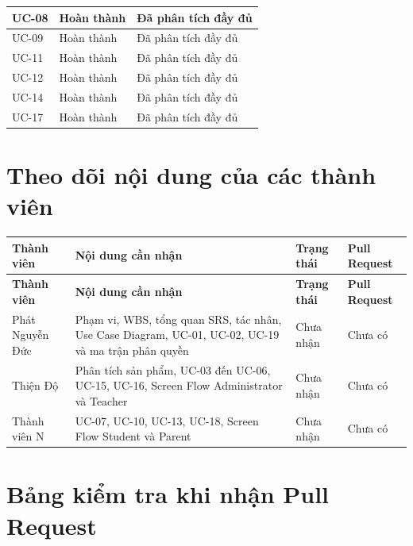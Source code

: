 \documentclass[12pt,a4paper]{article}
\begin{document}
\begin{longtable}{
			|p{8.8cm}
			|>{\centering\arraybackslash}p{2.3cm}
			|p{3.3cm}|
		}
		UC-08 &
		Hoàn thành &
		Đã phân tích đầy đủ \\
		\hline
		
		UC-09 &
		Hoàn thành &
		Đã phân tích đầy đủ \\
		\hline
		
		UC-11 &
		Hoàn thành &
		Đã phân tích đầy đủ \\
		\hline
		
		UC-12 &
		Hoàn thành &
		Đã phân tích đầy đủ \\
		\hline
		
		UC-14 &
		Hoàn thành &
		Đã phân tích đầy đủ \\
		\hline
		
		UC-17 &
		Hoàn thành &
		Đã phân tích đầy đủ \\
		\hline
		
	\end{longtable}
	
	\section{Theo dõi nội dung của các thành viên}
	
	\begin{longtable}{
			|p{3.2cm}
			|p{6.0cm}
			|p{2.6cm}
			|p{3.0cm}|
		}
		\hline
		\textbf{Thành viên} &
		\textbf{Nội dung cần nhận} &
		\textbf{Trạng thái} &
		\textbf{Pull Request} \\
		\hline
		\endfirsthead
		
		\hline
		\textbf{Thành viên} &
		\textbf{Nội dung cần nhận} &
		\textbf{Trạng thái} &
		\textbf{Pull Request} \\
		\hline
		\endhead
		
		Phát Nguyễn Đức &
		Phạm vi, WBS, tổng quan SRS, tác nhân, Use Case Diagram,
		UC-01, UC-02, UC-19 và ma trận phân quyền &
		Chưa nhận &
		Chưa có \\
		\hline
		
		Thiện Độ &
		Phân tích sản phẩm, UC-03 đến UC-06, UC-15, UC-16,
		Screen Flow Administrator và Teacher &
		Chưa nhận &
		Chưa có \\
		\hline
		
		Thành viên N &
		UC-07, UC-10, UC-13, UC-18,
		Screen Flow Student và Parent &
		Chưa nhận &
		Chưa có \\
		\hline
		
	\end{longtable}
	
	\section{Bảng kiểm tra khi nhận Pull Request}
	
\end{document}
